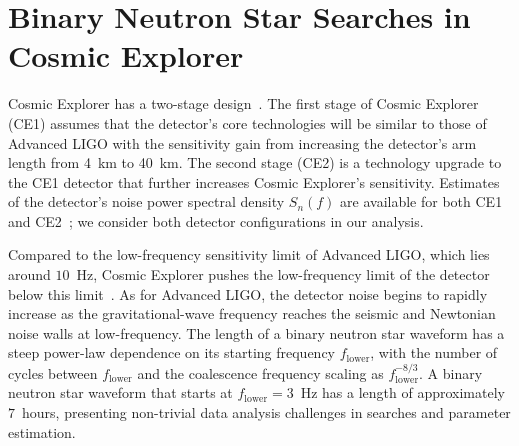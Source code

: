 \section{\label{s:3G-circ} Binary Neutron Star Searches in Cosmic Explorer}

Cosmic Explorer has a two-stage design~\cite{Reitze:2019dyk, Reitze:2019iox}. The first stage of Cosmic Explorer (CE1) assumes that the detector's core technologies will be similar to those of Advanced LIGO with the sensitivity gain from increasing the detector's arm length from 4~km to 40~km. The second stage (CE2) is a technology upgrade to the CE1 detector that further increases Cosmic Explorer's sensitivity. Estimates of the detector's noise power spectral density $S_n(f)$ are available for both CE1 and CE2~\cite{CE:NoiseCurves}; we consider both detector configurations in our analysis. 

Compared to the low-frequency sensitivity limit of Advanced LIGO, which lies around $10$~Hz, Cosmic Explorer pushes the low-frequency limit of the detector below this limit~\cite{Reitze:2019iox}. As for Advanced LIGO, the detector noise begins to rapidly increase as the gravitational-wave frequency reaches the seismic and Newtonian noise walls at low-frequency. The length of a binary neutron star waveform has a steep power-law dependence on its starting frequency $f_\mathrm{lower}$, with the number of cycles between $f_\mathrm{lower}$ and the coalescence frequency scaling as $f_\mathrm{lower}^{-8/3}$. A binary neutron star waveform that starts at $f_\mathrm{lower} = 3$~Hz has a length of approximately $7$~hours, presenting non-trivial data analysis challenges in searches and parameter estimation. 

